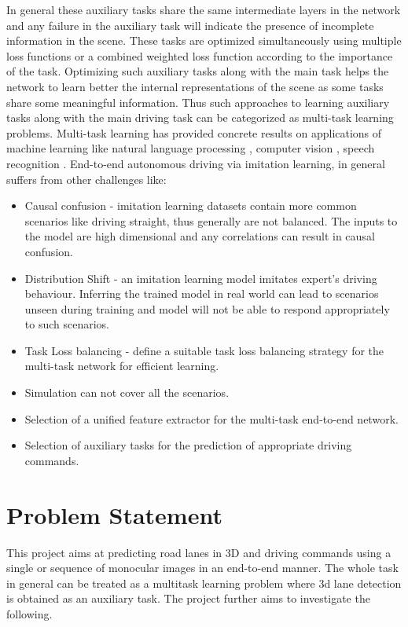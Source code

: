 \par In general these auxiliary tasks share the same intermediate layers in the network and any failure in the auxiliary task will indicate the presence of incomplete information in the scene. These tasks are optimized simultaneously using multiple loss functions or a combined weighted loss function according to the importance of the task. Optimizing such auxiliary tasks along with the main task helps the network to learn better the internal representations of the scene as some tasks share some meaningful information. Thus such approaches to learning auxiliary tasks along with the main driving task can be categorized as  multi-task learning problems. Multi-task learning has provided concrete results on applications of machine learning like natural language processing \cite{nlp}, computer vision \cite{DBLP:journals/corr/abs-2002-05347}, speech recognition \cite{qiu2021multitask}.    
End-to-end autonomous driving via imitation learning, in general suffers from other challenges like: 

\begin{itemize}
\item Causal confusion - imitation learning datasets contain more common scenarios like driving straight, thus  generally are not balanced. The inputs to the model are high dimensional and any correlations can result in causal confusion. 
\item Distribution Shift - an imitation learning model imitates expert's driving behaviour. Inferring the trained model in real world can lead to scenarios unseen during training and model will not be able to respond appropriately to such scenarios. 
\item Task Loss balancing - define a suitable task loss balancing strategy for the multi-task network for efficient learning.
\item Simulation can not cover all the scenarios.
\item Selection of a unified feature extractor for the multi-task end-to-end network.
\item Selection of auxiliary tasks for the prediction of appropriate driving commands. 
\end{itemize}

    \section{Problem Statement}
    This project aims at predicting road lanes in 3D and driving commands using a single or sequence of monocular images in an end-to-end manner. The whole task in general can be treated as a multitask learning problem where 3d lane detection is obtained as an auxiliary task. The project further aims to investigate the following.
    

